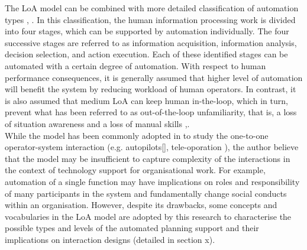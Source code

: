 The LoA model can be combined with more detailed classification of automation types \cite{Parasuraman2000}, \cite{Manzey2012}. In this classification,  the human information processing work is divided into four stages, which can be supported by automation individually. The four successive stages are referred to as information acquisition, information analysis, decision selection, and action execution. Each of these identified stages can be automated with a certain degree of automation. With respect to human performance consequences, it is generally assumed that higher level of automation will benefit the system by reducing workload of human operators. In contrast, it is also assumed that medium LoA can keep human in-the-loop, which in turn, prevent what has been referred to as out-of-the-loop unfamiliarity, that is, a loss of situation awareness and a loss of manual skills \cite{Kaber1997},\cite{Parasuraman2010}.\\

While the model has been commonly adopted in to study the one-to-one operator-system interaction (e.g. autopilots[], tele-oporation \cite{Schwarz2014}), the author believe that the model may be insufficient to capture complexity of the interactions in the context of technology support for organisational work. For example, automation of a single function may have implications on roles and responsibility of many participants in the system and fundamentally change social conducts within an organisation. However, despite its drawbacks, some concepts and vocabularies in the LoA model are adopted by this research to characterise the possible types and levels of the automated planning support and their implications on interaction designs (detailed in section x).\\


